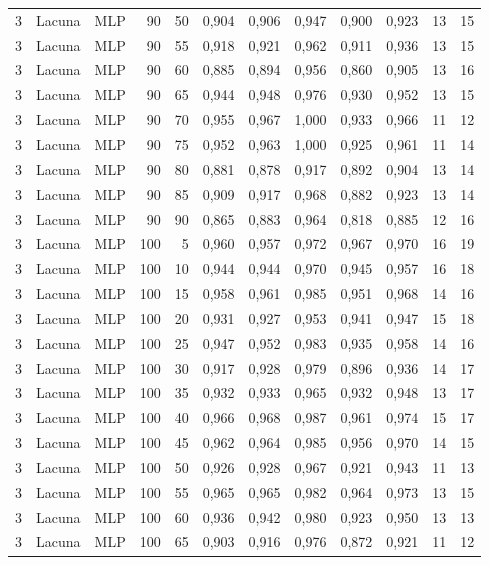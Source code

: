\begin{longtable}{@{}rllrrrrrrrrr@{}}
3 & Lacuna & MLP & 90 & 50 & 0,904 & 0,906 & 0,947 & 0,900 & 0,923 & 13 & 15 \\
3 & Lacuna & MLP & 90 & 55 & 0,918 & 0,921 & 0,962 & 0,911 & 0,936 & 13 & 15 \\
3 & Lacuna & MLP & 90 & 60 & 0,885 & 0,894 & 0,956 & 0,860 & 0,905 & 13 & 16 \\
3 & Lacuna & MLP & 90 & 65 & 0,944 & 0,948 & 0,976 & 0,930 & 0,952 & 13 & 15 \\
3 & Lacuna & MLP & 90 & 70 & 0,955 & 0,967 & 1,000 & 0,933 & 0,966 & 11 & 12 \\
3 & Lacuna & MLP & 90 & 75 & 0,952 & 0,963 & 1,000 & 0,925 & 0,961 & 11 & 14 \\
3 & Lacuna & MLP & 90 & 80 & 0,881 & 0,878 & 0,917 & 0,892 & 0,904 & 13 & 14 \\
3 & Lacuna & MLP & 90 & 85 & 0,909 & 0,917 & 0,968 & 0,882 & 0,923 & 13 & 14 \\
3 & Lacuna & MLP & 90 & 90 & 0,865 & 0,883 & 0,964 & 0,818 & 0,885 & 12 & 16 \\
3 & Lacuna & MLP & 100 & 5 & 0,960 & 0,957 & 0,972 & 0,967 & 0,970 & 16 & 19 \\
3 & Lacuna & MLP & 100 & 10 & 0,944 & 0,944 & 0,970 & 0,945 & 0,957 & 16 & 18 \\
3 & Lacuna & MLP & 100 & 15 & 0,958 & 0,961 & 0,985 & 0,951 & 0,968 & 14 & 16 \\
3 & Lacuna & MLP & 100 & 20 & 0,931 & 0,927 & 0,953 & 0,941 & 0,947 & 15 & 18 \\
3 & Lacuna & MLP & 100 & 25 & 0,947 & 0,952 & 0,983 & 0,935 & 0,958 & 14 & 16 \\
3 & Lacuna & MLP & 100 & 30 & 0,917 & 0,928 & 0,979 & 0,896 & 0,936 & 14 & 17 \\
3 & Lacuna & MLP & 100 & 35 & 0,932 & 0,933 & 0,965 & 0,932 & 0,948 & 13 & 17 \\
3 & Lacuna & MLP & 100 & 40 & 0,966 & 0,968 & 0,987 & 0,961 & 0,974 & 15 & 17 \\
3 & Lacuna & MLP & 100 & 45 & 0,962 & 0,964 & 0,985 & 0,956 & 0,970 & 14 & 15 \\
3 & Lacuna & MLP & 100 & 50 & 0,926 & 0,928 & 0,967 & 0,921 & 0,943 & 11 & 13 \\
3 & Lacuna & MLP & 100 & 55 & 0,965 & 0,965 & 0,982 & 0,964 & 0,973 & 13 & 15 \\
3 & Lacuna & MLP & 100 & 60 & 0,936 & 0,942 & 0,980 & 0,923 & 0,950 & 13 & 13 \\
3 & Lacuna & MLP & 100 & 65 & 0,903 & 0,916 & 0,976 & 0,872 & 0,921 & 11 & 12 \\

\end{longtable}
